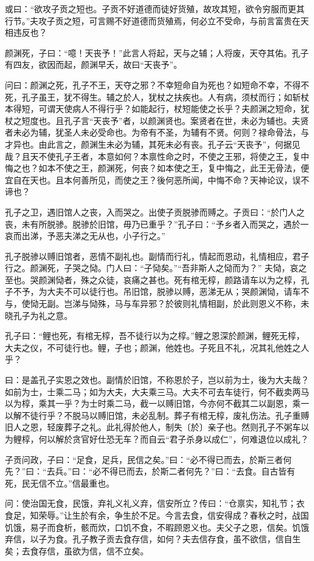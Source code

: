 \documentclass[]{article}
\begin{document}
或曰：``欲攻子贡之短也。子贡不好道德而徒好货殖，故攻其短，欲令穷服而更其行节。''夫攻子贡之短，可言赐不好道德而货殖焉，何必立不受命，与前言富贵在天相违反也？

颜渊死，子曰：``噫！天丧予！''此言人将起，天与之辅；人将废，天夺其佑。孔子有四友，欲因而起，颜渊早夭，故曰``天丧予''。

问曰：颜渊之死，孔子不王，天夺之邪？不幸短命自为死也？如短命不幸，不得不死，孔子虽王，犹不得生。辅之於人，犹杖之扶疾也。人有病，须杖而行；如斩杖本得短，可谓天使病人不得行乎？如能起行，杖短能使之长乎？夫颜渊之短命，犹杖之短度也。且孔子言``天丧予''者，以颜渊贤也。案贤者在世，未必为辅也。夫贤者未必为辅，犹圣人未必受命也。为帝有不圣，为辅有不贤。何则？禄命骨法，与才异也。由此言之，颜渊生未必为辅，其死未必有丧。孔子云``天丧予''，何据见哉？且天不使孔子王者，本意如何？本禀性命之时，不使之王邪，将使之王，复中悔之也？如本不使之王，颜渊死，何丧？如本使之王，复中悔之，此王无骨法，便宜自在天也。且本何善所见，而使之王？後何恶所闻，中悔不命？天神论议，误不谛也？

孔子之卫，遇旧馆人之丧，入而哭之。出使子贡脱骖而赙之。子贡曰：``於门人之丧，未有所脱骖。脱骖於旧馆，毋乃已重乎？''孔子曰：``予乡者入而哭之，遇於一哀而出涕，予恶夫涕之无从也，小子行之。''

孔子脱骖以赙旧馆者，恶情不副礼也。副情而行礼，情起而恩动，礼情相应，君子行之。颜渊死，子哭之恸。门人曰：``子恸矣。''``吾非斯人之恸而为？''
夫恸，哀之至也。哭颜渊恸者，殊之众徒，哀痛之甚也。死有棺无椁，颜路请车以为之椁，孔子不予，为大夫不可以徒行也。吊旧馆，脱骖以赙，恶涕无从；哭颜渊恸，请车不与，使恸无副。岂涕与恸殊，马与车异邪？於彼则礼情相副，於此则恩义不称，未晓孔子为礼之意。

孔子曰：``鲤也死，有棺无椁，吾不徒行以为之椁。''鲤之恩深於颜渊，鲤死无椁，大夫之仪，不可徒行也。鲤，子也；颜渊，他姓也。子死且不礼，况其礼他姓之人乎？

曰：是盖孔子实恩之效也。副情於旧馆，不称恩於子，岂以前为士，後为大夫哉？如前为士，士乘二马；如为大夫，大夫乘三马。大夫不可去车徒行，何不截卖两马以为椁，乘其一乎？为士时乘二马，截一以赙旧馆，今亦何不截其二以副恩，乘一以解不徒行乎？不脱马以赙旧馆，未必乱制。葬子有棺无椁，废礼伤法。孔子重赙旧人之恩，轻废葬子之礼。此礼得於他人，制失〔於〕亲子也。然则孔子不粥车以为鲤椁，何以解於贪官好仕恐无车？而自云``君子杀身以成仁''，何难退位以成礼？

子贡问政，子曰：``足食，足兵，民信之矣。''曰：``必不得已而去，於斯三者何先？''曰：``去兵。''曰：``必不得已而去，於斯二者何先？''曰：``去食。自古皆有死，民无信不立。''信最重也。

问：使治国无食，民饿，弃礼义礼义弃，信安所立？传曰：``仓禀实，知礼节；衣食足，知荣辱。''让生於有余，争生於不足。今言去食，信安得成？春秋之时，战国饥饿，易子而食析，骸而炊，口饥不食，不暇顾恩义也。夫父子之恩，信矣。饥饿弃信，以子为食。孔子教子贡去食存信，如何？夫去信存食，虽不欲信，信自生矣；去食存信，虽欲为信，信不立矣。
\end{document}
